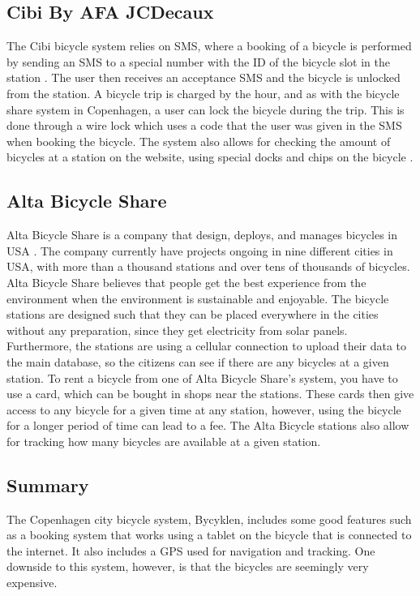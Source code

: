 \subsection{Cibi By AFA JCDecaux}
The Cibi bicycle system relies on SMS, where a booking of a bicycle is performed by sending an SMS to a special number with the ID of the bicycle slot in the station \citep{misc:cibi}. 
The user then receives an acceptance SMS and the bicycle is unlocked from the station. 
A bicycle trip is charged by the hour, and as with the bicycle share system in Copenhagen, a user can lock the bicycle during the trip. 
This is done through a wire lock which uses a code that the user was given in the SMS when booking the bicycle.
The system also allows for checking the amount of bicycles at a station on the website, using special docks and chips on the bicycle \citep{misc:omcibi}.

\subsection{Alta Bicycle Share}\label{subsec:alta}
Alta Bicycle Share is a company that design, deploys, and manages bicycles in USA \citep{misc:AltaBicycleShare}.
The company currently have projects ongoing in nine different cities in USA, with more than a thousand stations and over tens of thousands of bicycles. 
Alta Bicycle Share believes that people get the best experience from the environment when the environment is sustainable and enjoyable.
The bicycle stations are designed such that they can be placed everywhere in the cities without any preparation, since they get electricity from solar panels.
Furthermore, the stations are using a cellular connection to upload their data to the main database, so the citizens can see if there are any bicycles at a given station.
To rent a bicycle from one of Alta Bicycle Share's system, you have to use a card, which can be bought in shops near the stations.
These cards then give access to any bicycle for a given time at any station, however, using the bicycle for a longer period of time can lead to a fee.
The Alta Bicycle stations also allow for tracking how many bicycles are available at a given station.

\subsection{Summary}
The Copenhagen city bicycle system, Bycyklen, includes some good features such as a booking system that works using a tablet on the bicycle that is connected to the internet.
It also includes a GPS used for navigation and tracking.
One downside to this system, however, is that the bicycles are seemingly very expensive.

